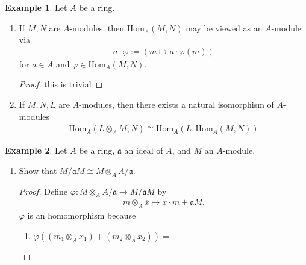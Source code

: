 \documentclass[a4paper]{book}
\theoremstyle{definition}
\newtheorem{example}{Example}[definition]
\begin{document}
\begin{example}
    Let \(A\) be a ring.
    \begin{enumerate}
        \item If \(M, N\) are \(A\)-modules, then \(\mathrm{Hom}_A(M, N)\) may be viewed as an \(A\)-module via
        \begin{align*}
            a \cdot \varphi := (m \mapsto a \cdot \varphi(m))
        \end{align*}
        for \(a \in A\) and \(\varphi \in \mathrm{Hom}_A(M, N)\).

        \begin{proof}
            this is trivial
        \end{proof}
        \item If \(M, N, L\) are \(A\)-modules, then there exists a natural isomorphism of \(A\)-modules
        \begin{align*}
            \mathrm{Hom}_A(L \otimes_A M, N) \cong \mathrm{Hom}_A(L, \mathrm{Hom}_A(M, N))
        \end{align*}
    \end{enumerate}
\end{example}

\begin{example}
    Let \(A\) be a ring, \(\mathfrak{a}\) an ideal of \(A\), and \(M\) an \(A\)-module.
    \begin{enumerate}
        \item Show that \(M / \mathfrak{a} M \cong M \otimes_A A / \mathfrak{a}\).
        \begin{proof}
            Define \(\varphi: M \otimes_A A / \mathfrak{a} \rightarrow M / \mathfrak{a}M \) by
            \begin{align*}
                m \otimes_A \overline{x} \mapsto x \cdot m + \mathfrak{a}M \text{.}
            \end{align*}
            \(\varphi\) is an homomorphism because
            \begin{enumerate}
                \item \(\varphi((m_1 \otimes_A \overline{x_1}) + (m_2 \otimes_A \overline{x_2})) = \)
            \end{enumerate}
        \end{proof}
    \end{enumerate}
\end{example}
\end{document}
